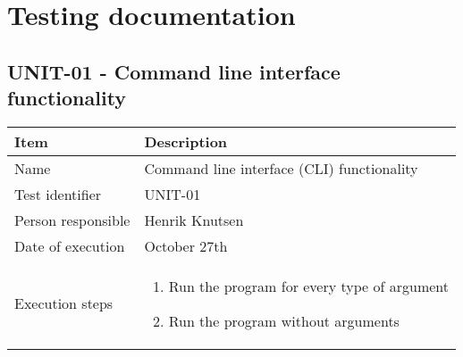 \documentclass[a4paper]{article}
\begin{document}
\section{Testing documentation}
\subsection{UNIT-01 - Command line interface functionality}
	\begin{center}
		\begin{tabular}{ |  p{3cm} | p{7cm} | }
			\hline
			Item & Description \\ [5pt] \hline \hline
			Name & Command line interface (CLI) functionality \\  [5pt] \hline
			Test identifier & UNIT-01 \\  [5pt] \hline
			Person responsible & Henrik Knutsen \\  [5pt] \hline
			Date of execution & October 27th \\  [5pt] \hline

			Execution steps & 	\begin{enumerate}
							\item Run the program for every type of argument
							\item Run the program without arguments
						\end{enumerate} \\ [5pt] \hline


\end{tabular}
\end{center}
\end{document}
